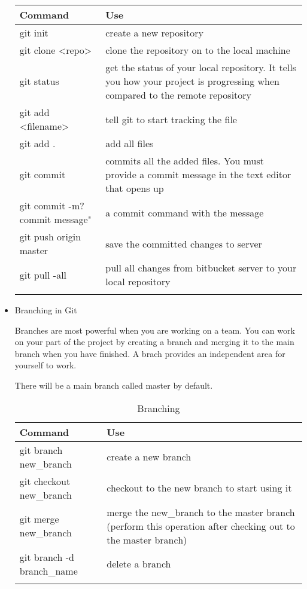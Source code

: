 \documentclass{article}
\begin{document}
\begin{itemize}
\begin{table}[htb]
\label{Basic commands in Git}
\begin{tabular}{|p{7cm}|p{7cm}|}
\noalign{\smallskip} \hline \hline \noalign{\smallskip}
Command & Use\\
\hline
git init & create a new repository\\
git clone <repo>& clone the repository on to the local machine\\
git status &get the status of your local repository. It tells you how your project is progressing when compared to the remote repository\\
git add <filename> & tell git to start tracking the file\\
git add . & add all files\\
git commit  & commits all the added files. You must provide a commit message in the text editor that opens up\\
git commit -m?commit message" & a commit command with the message\\
git push origin master & save the committed changes to server\\
git pull -all & pull all changes from bitbucket server to your local repository\\
\noalign{\smallskip} \hline \hline \noalign{\smallskip}
\end{tabular}
\end{table}


\item Branching in Git

Branches are most powerful when you are working on a team. You can work on your part of the project by creating a branch and merging it to the main branch when you have finished. A brach provides an independent area for yourself to work.

There will be a main branch called master by default.

\begin{table}[htb]
\caption{Branching}
\begin{tabular}{|p{7cm}|p{7cm}|}
\noalign{\smallskip} \hline \hline \noalign{\smallskip}
Command & Use\\
\hline
git branch new\_branch & create a new branch \\
git checkout new\_branch & checkout to the new branch to start using it\\
git merge new\_branch & merge the new\_branch to the master branch (perform this operation after checking out to the master branch)\\
git branch -d branch\_name & delete a branch\\
\noalign{\smallskip} \hline \hline \noalign{\smallskip}
\end{tabular}
\end{table}


\end{itemize}
\end{document}
